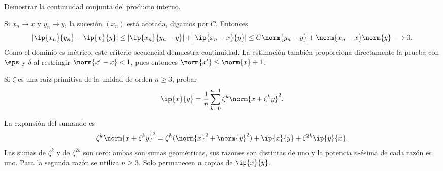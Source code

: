 \begin{ejercicio}
Demostrar la continuidad conjunta del producto interno.
\end{ejercicio}
\begin{solucion}
Si $x_n\to x$ y $y_n\to y$, la sucesión $(x_n)$ está acotada, digamos por $C$. Entonces
\[
 |\ip{x_n}{y_n}-\ip{x}{y}|
 \leq |\ip{x_n}{y_n-y}|+|\ip{x_n-x}{y}|
 \leq C\norm{y_n-y}+\norm{x_n-x}\norm{y}\longrightarrow0.
\]
Como el dominio es métrico, este criterio secuencial demuestra continuidad. La estimación también proporciona directamente la prueba con $\eps$ y $\delta$ al restringir $\norm{x'-x}<1$, pues entonces $\norm{x'}\leq\norm{x}+1$.
\end{solucion}

\begin{ejercicio}
Si $\zeta$ es una raíz primitiva de la unidad de orden $n\geq3$, probar
\[
 \ip{x}{y}=\frac1n\sum_{k=0}^{n-1}\zeta^k\norm{x+\zeta^ky}^{2}.
\]
\end{ejercicio}
\begin{solucion}
La expansión del sumando es
\[
 \zeta^k\norm{x+\zeta^ky}^{2}
 =\zeta^k(\norm{x}^{2}+\norm{y}^{2})+\ip{x}{y}+\zeta^{2k}\ip{y}{x}.
\]
Las sumas de $\zeta^k$ y de $\zeta^{2k}$ son cero: ambas son sumas geométricas, sus razones son distintas de uno y la potencia $n$-ésima de cada razón es uno. Para la segunda razón se utiliza $n\geq3$. Solo permanecen $n$ copias de $\ip{x}{y}$.
\end{solucion}

